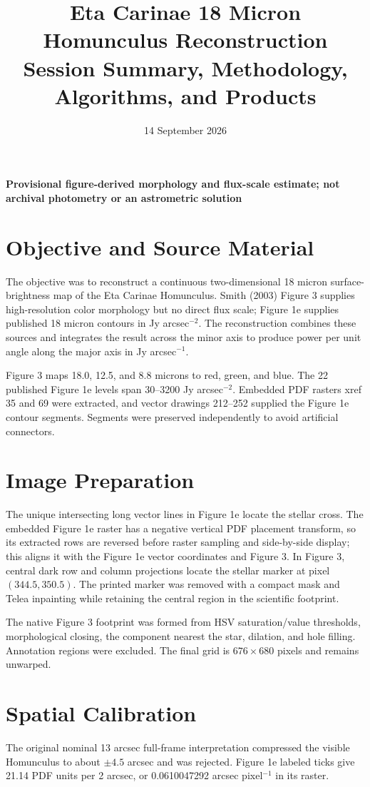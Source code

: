 \documentclass[11pt]{article}
\title{\textbf{Eta Carinae 18 Micron Homunculus Reconstruction}\\\large Session Summary, Methodology, Algorithms, and Products}
\author{}
\date{14 September 2026}
\begin{document}
\maketitle
\begin{center}
\color{accent}\textbf{Provisional figure-derived morphology and flux-scale estimate; not archival photometry or an astrometric solution}
\end{center}

\section{Objective and Source Material}
The objective was to reconstruct a continuous two-dimensional 18 micron surface-brightness map of the Eta Carinae Homunculus. Smith (2003) Figure 3 supplies high-resolution color morphology but no direct flux scale; Figure 1e supplies published 18 micron contours in Jy arcsec$^{-2}$. The reconstruction combines these sources and integrates the result across the minor axis to produce power per unit angle along the major axis in Jy arcsec$^{-1}$.

Figure 3 maps 18.0, 12.5, and 8.8 microns to red, green, and blue. The 22 published Figure 1e levels span 30--3200 Jy arcsec$^{-2}$. Embedded PDF rasters xref 35 and 69 were extracted, and vector drawings 212--252 supplied the Figure 1e contour segments. Segments were preserved independently to avoid artificial connectors.

\section{Image Preparation}
The unique intersecting long vector lines in Figure 1e locate the stellar cross. The embedded Figure 1e raster has a negative vertical PDF placement transform, so its extracted rows are reversed before raster sampling and side-by-side display; this aligns it with the Figure 1e vector coordinates and Figure 3. In Figure 3, central dark row and column projections locate the stellar marker at pixel $(344.5,350.5)$. The printed marker was removed with a compact mask and Telea inpainting while retaining the central region in the scientific footprint.

The native Figure 3 footprint was formed from HSV saturation/value thresholds, morphological closing, the component nearest the star, dilation, and hole filling. Annotation regions were excluded. The final grid is $676\times680$ pixels and remains unwarped.

\section{Spatial Calibration}
The original nominal 13 arcsec full-frame interpretation compressed the visible Homunculus to about $\pm4.5$ arcsec and was rejected. Figure 1e labeled ticks give 21.14 PDF units per 2 arcsec, or 0.0610047292 arcsec pixel$^{-1}$ in its raster.
\end{document}
